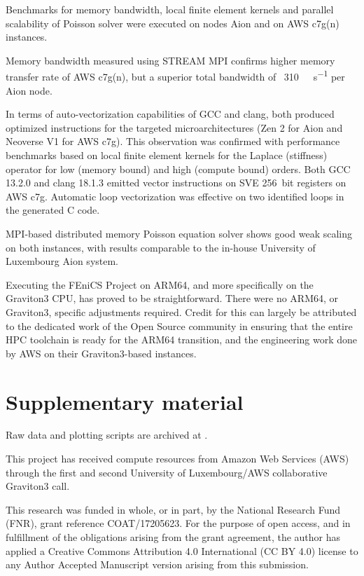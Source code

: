 Benchmarks for memory bandwidth, local finite element kernels and parallel
scalability of Poisson solver were executed on nodes Aion and on AWS c7g(n)
instances.

Memory bandwidth measured using STREAM MPI confirms higher memory transfer rate
of AWS c7g(n), but a superior total bandwidth of ~\SI{310}{\giga\byte\per\second}
per Aion node.

In terms of auto-vectorization capabilities of GCC and clang, both produced
optimized instructions for the targeted microarchitectures (Zen 2 for Aion and
Neoverse V1 for AWS c7g). This observation was confirmed with performance
benchmarks based on local finite element kernels for the Laplace (stiffness)
operator for low (memory bound) and high (compute bound) orders. Both
GCC 13.2.0 and clang 18.1.3 emitted vector instructions on SVE \SI{256}{bit}
registers on AWS c7g. Automatic loop vectorization was effective on two identified
loops in the generated C code.

MPI-based distributed memory Poisson equation solver shows good weak scaling on
both instances, with results comparable to the in-house University of Luxembourg
Aion system.

Executing the FEniCS Project on ARM64, and more specifically on the Graviton3
CPU, has proved to be straightforward. There were no ARM64, or Graviton3,
specific adjustments required. Credit for this can largely be attributed to the
dedicated work of the Open Source community in ensuring that the entire HPC
toolchain is ready for the ARM64 transition, and the engineering work done by
AWS on their Graviton3-based instances.

\section*{Supplementary material}
Raw data and plotting scripts are archived at \citep{}.

\begin{acknowledgement}
This project has received compute resources from Amazon Web Services (AWS)
through the first and second University of Luxembourg/AWS collaborative
Graviton3 call.

This research was funded in whole, or in part, by the National Research Fund
(FNR), grant reference COAT/17205623. For the purpose of open access, and in
fulfillment of the obligations arising from the grant agreement, the author has
applied a Creative Commons Attribution 4.0 International (CC BY 4.0) license to
any Author Accepted Manuscript version arising from this submission.
\end{acknowledgement}





